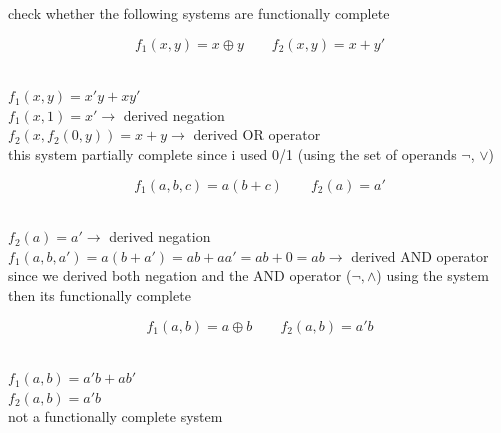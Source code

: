 \documentclass[a4paper,12pt]{article}
\begin{document}
\begin{question}
check whether the following systems are functionally complete\\[0pt]
\begin{subquestion}
\[
f_1(x,y) = x \oplus y \qquad f_2(x,y) = x + y'
\]\\[0pt]
\begin{answer}
\(f_1(x,y)=x'y+xy'\)\\[0pt]
\(f_1(x,1)=x' \longrightarrow\) derived negation\\[0pt]
\(f_2(x, f_2(0, y)) = x+y \longrightarrow\) derived OR operator\\[0pt]
this system partially complete since i used 0/1 (using the set of operands \(\lnot\), \(\lor\))\\[0pt]
\end{answer}
\end{subquestion}
\begin{subquestion}
\[
f_1(a,b,c) = a(b+c) \qquad f_2(a) = a'
\]\\[0pt]
\begin{answer}
\(f_2(a) = a' \longrightarrow\) derived negation\\[0pt]
\(f_1(a,b,a')=a(b+a')=ab+aa'=ab+0=ab \longrightarrow\) derived AND operator\\[0pt]
since we derived both negation and the AND operator (\(\lnot, \land\)) using the system then its functionally complete\\[0pt]
\end{answer}
\end{subquestion}
\begin{subquestion}
\[
f_1(a,b) = a \oplus b \qquad f_2(a,b) = a'b
\]\\[0pt]
\begin{answer}
\(f_1(a,b)=a'b+ab'\)\\[0pt]
\(f_2(a,b)=a'b\)\\[0pt]
not a functionally complete system\\[0pt]
\end{answer}
\end{subquestion}
\end{question}
\end{document}

